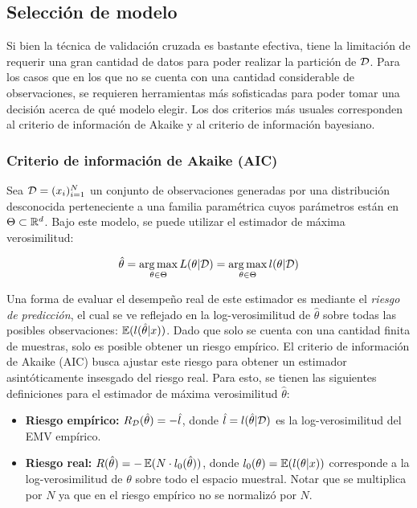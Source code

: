 \subsection{Selección de modelo}

Si bien la técnica de validación cruzada es bastante efectiva, tiene la limitación de requerir una gran cantidad de datos para poder realizar la partición de ${\mathcal D}$. Para los casos que en los que no se cuenta con una cantidad considerable de observaciones, se requieren herramientas más sofisticadas para poder tomar una decisión acerca de qué modelo elegir. Los dos criterios más usuales corresponden al criterio de información de Akaike y al criterio de información bayesiano.\\

\subsubsection{Criterio de información de Akaike (AIC)}


Sea ${\mathcal D}=(x_i)_{i=1}^N$ un conjunto de observaciones generadas por una distribución desconocida perteneciente a una familia paramétrica cuyos parámetros están en $\Theta\subset\mathbb{R}^d$. Bajo este modelo, se puede utilizar el estimador de máxima verosimilitud:

\begin{equation}
	\hat{\theta} = \operatorname*{arg\,max}_{\theta\in\Theta} L(\theta|{\mathcal D}) =  \operatorname*{arg\,max}_{\theta\in\Theta} l(\theta|{\mathcal D})
\end{equation}

Una forma de evaluar el desempeño real de este estimador es mediante el \emph{riesgo de predicción}, el cual se ve reflejado en la log-verosimilitud de $\hat{\theta}$ sobre todas las posibles observaciones: $\operatorname{\mathbb{E}}(l(\hat{\theta}|x))$. Dado que solo se cuenta con una cantidad finita de muestras, solo es posible obtener un riesgo empírico. El criterio de información de Akaike (AIC) busca ajustar este riesgo para obtener un estimador asintóticamente insesgado del riesgo real. Para esto, se tienen las siguientes definiciones para el estimador de máxima verosimilitud $\hat{\theta}$:

\begin{itemize}
	\item \textbf{Riesgo empírico:} $R_{\mathcal D}(\hat{\theta})=-\hat{l}$, donde $\hat{l}=l(\hat{\theta}|{\mathcal D})$ es la log-verosimilitud del EMV empírico.
	\item \textbf{Riesgo real:} $R(\hat{\theta})=-\operatorname{\mathbb{E}}(N\cdot l_0(\hat{\theta}))$, donde $l_0(\theta)=\operatorname{\mathbb{E}}(l(\theta|x))$ corresponde a la log-verosimilitud de $\theta$ sobre todo el espacio muestral. Notar que se multiplica por $N$ ya que en el riesgo empírico no se normalizó por $N$.
\end{itemize}

